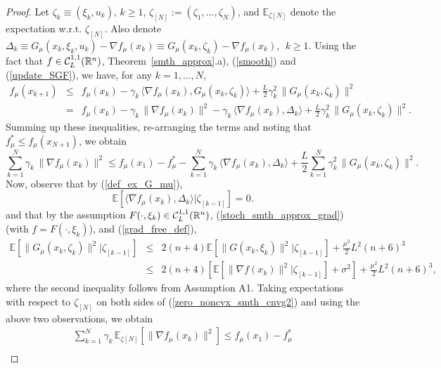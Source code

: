 \documentclass[final]{siamltex}
\newcommand{\beq}{\begin{equation}}
\newcommand{\eeq}{\end{equation}}
\def\eqnok#1{(\ref{#1})}
\def\vgap{\vspace*{.1in}}
\newcommand{\bbe}{\mathbb{E}}
\newcommand{\bbr}{\mathbb{R}}
\begin{document}
\vgap


\begin{proof}
Let $\zeta_k \equiv (\xi_k, u_k)$, $k \ge 1$, $\zeta_{[N]}:=(\zeta_1,...,\zeta_{N})$,
and $\bbe_{\zeta[N]}$ denote the expectation w.r.t. $\zeta_{[N]}$.
Also denote $\Delta_k \equiv G_{\mu}(x_k, \xi_k, u_k) - \nabla f_{\mu}(x_k) \equiv
 G_{\mu}(x_k,\zeta_k) - \nabla f_{\mu}(x_k),\ \  k \ge 1$.
Using the fact that $f \in {\cal C}_L^{1,1}(\bbr^n)$, Theorem~\ref{smth_approx}.a),
\eqnok{smooth} and \eqnok{update_SGF}, we have, for any $k = 1, \ldots, N$,
\beq \label{zero_noncvx_smth_cnvg1}
\begin{array}{lll}
f_{\mu}(x_{k+1}) &\le& f_{\mu}(x_k)-\gamma_k \, \langle \nabla f_{\mu}(x_k), G_{\mu}(x_k, \zeta_k) \rangle
+ \frac{L}{2} \gamma_k^2 \, \|G_{\mu}(x_k, \zeta_k)\|^2 \\
&=& f_{\mu}(x_k) -\gamma_k \, \|\nabla f_{\mu}(x_k)\|^2 - \gamma_k \, \langle \nabla f_{\mu}(x_k), \Delta_k \rangle
+ \frac{L}{2} \gamma_k^2 \, \|G_{\mu}(x_k, \zeta_k)\|^2.
\end{array}
\eeq
Summing up these inequalities, re-arranging the terms and noting that $f^*_{\mu} \le f_{\mu}(x_{N+1})$, we obtain
\beq \label{zero_noncvx_smth_cnvg2}
\sum_{k=1}^N \gamma_k \, \|\nabla f_{\mu}(x_k)\|^2
\le f_{\mu}(x_1) - f^*_{\mu} - \sum_{ k=1}^N \gamma_k \, \langle \nabla f_{\mu}(x_k), \Delta_k \rangle
+ \frac{L}{2}\sum_{k=1}^N \gamma_k^2 \, \|G_{\mu}(x_k, \zeta_k)\|^2.
\eeq
Now, observe that by \eqnok{def_ex_G_mu},
\beq \label{ass3_seq1}
\bbe[\langle \nabla f_{\mu}(x_k), \Delta_k \rangle |\zeta_{[k-1]}] = 0.
\eeq
and that by the assumption $F(\cdot, \xi_k) \in {\cal C}_L^{1,1}(\bbr^n)$,
\eqnok{stoch_smth_approx_grad} (with $f= F(\cdot, \xi_k)$), and \eqnok{grad_free_def},
\beq \label{exp_Gmu_bnd}
\begin{array}{lll}
\bbe[\|G_{\mu}(x_k, \zeta_k)\|^2|\zeta_{[k-1]}] &\le&
2(n+4)\bbe[\|G(x_k, \xi_k)\|^2|\zeta_{[k-1]}] + \frac{\mu^2}{2} L^2 (n+6)^3  \\
&\le& 2(n+4) \left[\bbe[\|\nabla f(x_k)\|^2|\zeta_{[k-1]}] + \sigma^2\right]
+ \frac{\mu^2}{2} L^2 (n+6)^3, 
\end{array}
\eeq
where the second inequality follows from Assumption A1.
Taking expectations with respect to $\zeta_{[N]}$
on both sides of \eqnok{zero_noncvx_smth_cnvg2}
and using the above two observations, we obtain
\[
\begin{array}{l}
\sum\limits_{k=1}^N \gamma_k \, \bbe_{\zeta[N]}\left[\|\nabla f_{\mu}(x_k)\|^2\right]
\le f_{\mu}(x_1) - f^*_{\mu} \\

\end{array}\]
\end{proof}
\end{document}
